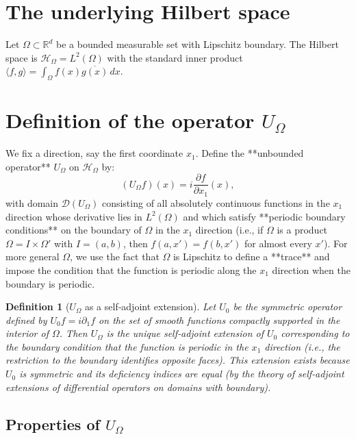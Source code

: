 \documentclass[11pt,a4paper]{article}
\newtheorem{definition}[theorem]{Definition}
\begin{document}
\section{The underlying Hilbert space}

Let $\Omega \subset \mathbb{R}^d$ be a bounded measurable set with Lipschitz boundary. The Hilbert space is $\mathcal{H}_\Omega = L^2(\Omega)$ with the standard inner product $\langle f,g \rangle = \int_\Omega f(x)\overline{g(x)} \, dx$.

\section{Definition of the operator $U_\Omega$}

We fix a direction, say the first coordinate $x_1$. Define the **unbounded operator** $U_\Omega$ on $\mathcal{H}_\Omega$ by:
\[
(U_\Omega f)(x) = i \frac{\partial f}{\partial x_1}(x),
\]
with domain $\mathcal{D}(U_\Omega)$ consisting of all absolutely continuous functions in the $x_1$ direction whose derivative lies in $L^2(\Omega)$ and which satisfy **periodic boundary conditions** on the boundary of $\Omega$ in the $x_1$ direction (i.e., if $\Omega$ is a product $\Omega = I \times \Omega'$ with $I = (a,b)$, then $f(a,x') = f(b,x')$ for almost every $x'$). For more general $\Omega$, we use the fact that $\Omega$ is Lipschitz to define a **trace** and impose the condition that the function is periodic along the $x_1$ direction when the boundary is periodic.

\begin{definition}[$U_\Omega$ as a self‑adjoint extension]
Let $U_0$ be the symmetric operator defined by $U_0 f = i \partial_1 f$ on the set of smooth functions compactly supported in the interior of $\Omega$. Then $U_\Omega$ is the unique self‑adjoint extension of $U_0$ corresponding to the boundary condition that the function is periodic in the $x_1$ direction (i.e., the restriction to the boundary identifies opposite faces). This extension exists because $U_0$ is symmetric and its deficiency indices are equal (by the theory of self‑adjoint extensions of differential operators on domains with boundary).
\end{definition}

\subsection{Properties of $U_\Omega$}
\end{document}
